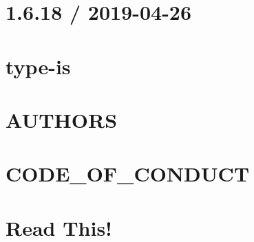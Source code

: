 \documentclass[twoside]{book}
\newcommand{\+}{\discretionary{\mbox{\scriptsize$\hookleftarrow$}}{}{}}
\begin{document}
\chapter{1.6.18 / 2019-\/04-\/26}
\label{md__c___users_vaishnavi_jadhav__desktop__developer_code_mean_stack_example_server_node_modules_type_is__h_i_s_t_o_r_y}

\chapter{type-\/is}
\label{md__c___users_vaishnavi_jadhav__desktop__developer_code_mean_stack_example_server_node_modules_type_is__r_e_a_d_m_e}

\chapter{AUTHORS}
\label{md__c___users_vaishnavi_jadhav__desktop__developer_code_mean_stack_example_server_node_modules_typescript__a_u_t_h_o_r_s}

\chapter{CODE\+\_\+\+OF\+\_\+\+CONDUCT}
\label{md__c___users_vaishnavi_jadhav__desktop__developer_code_mean_stack_example_server_node_modules_td07a7b0b13dea07a4cc73a0c172cda91}

\chapter{Read This!}
\label{md__c___users_vaishnavi_jadhav__desktop__developer_code_mean_stack_example_server_node_modules_typescript_lib__r_e_a_d_m_e}

\end{document}
